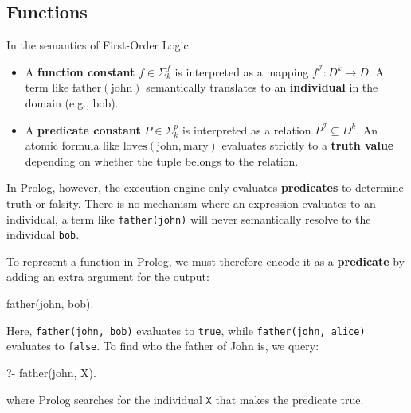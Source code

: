 \subsection{Functions}
\begin{excursion}{}
\end{excursion}


In the semantics of First-Order Logic:
\begin{itemize}
    \item A \textbf{function constant} $f \in \Sigma_k^f$ is interpreted as a mapping $f^\mathcal{I}: D^k \to D$. A term like $\text{father}(\text{john})$ semantically translates to an \textbf{individual} in the domain (e.g., $\text{bob}$).
    \item A \textbf{predicate constant} $P \in \Sigma_k^p$ is interpreted as a relation $P^\mathcal{I} \subseteq D^k$. An atomic formula like $\text{loves}(\text{john}, \text{mary})$ evaluates strictly to a \textbf{truth value} depending on whether the tuple belongs to the relation.
\end{itemize}

In Prolog, however, the execution engine only evaluates \textbf{predicates} to determine truth or falsity. There is no mechanism where an expression evaluates to an individual, a term like \texttt{father(john)} will never semantically resolve to the individual \texttt{bob}.

To represent a function in Prolog, we must therefore encode it as a \textbf{predicate} by adding an extra argument for the output:
\begin{codeblock}
father(john, bob).    
\end{codeblock}
Here, \texttt{father(john, bob)} evaluates to \texttt{true}, while \texttt{father(john, alice)} evaluates to \texttt{false}. To find who the father of John is, we query:
\begin{codeblock}
?- father(john, X).
\end{codeblock}
where Prolog searches for the individual \texttt{X} that makes the predicate true.